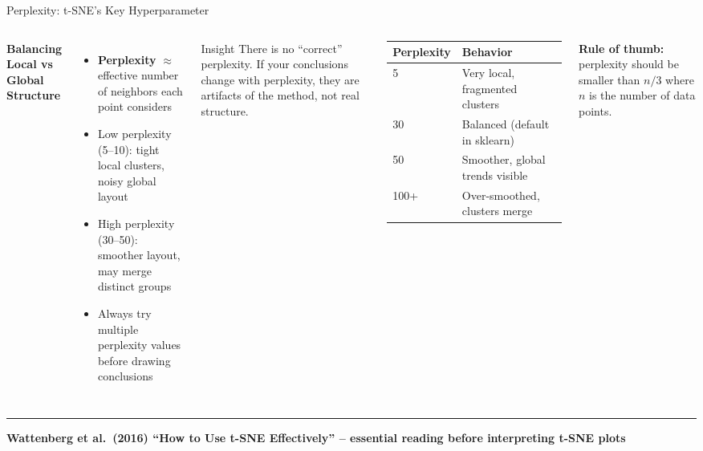 \documentclass[8pt,aspectratio=169]{beamer}
\newcommand{\bottomnote}[1]{%
\vfill
\vspace{-2mm}
\textcolor{mllavender2}{\rule{\textwidth}{0.4pt}}
\vspace{1mm}
\footnotesize
\textbf{#1}
}
\newenvironment{compactlist}{%
  \begin{itemize}%
    \setlength{\itemsep}{2pt}%
    \setlength{\parskip}{0pt}%
    \setlength{\parsep}{0pt}%
}{%
  \end{itemize}%
}
\newcommand{\highlight}[1]{\textcolor{mlorange}{\textbf{#1}}}
\begin{document}
\begin{frame}[t]{Perplexity: t-SNE's Key Hyperparameter}
\begin{columns}[T]
\small
\textbf{Balancing Local vs Global Structure}
\begin{compactlist}
\item \highlight{Perplexity} $\approx$ effective number of neighbors each point considers
\item Low perplexity (5--10): tight local clusters, noisy global layout
\item High perplexity (30--50): smoother layout, may merge distinct groups
\item Always try multiple perplexity values before drawing conclusions
\end{compactlist}

\begin{block}{Insight}
\scriptsize There is no ``correct'' perplexity. If your conclusions change with perplexity, they are artifacts of the method, not real structure.
\end{block}

\vspace{2mm}
\footnotesize
\begin{tabular}{@{}l p{3.0cm}@{}}
\toprule
\textbf{Perplexity} & \textbf{Behavior} \\
\midrule
\rowcolor{mllavender4}
5 & Very local, fragmented clusters \\
30 & Balanced (default in sklearn) \\
\rowcolor{mllavender4}
50 & Smoother, global trends visible \\
100+ & Over-smoothed, clusters merge \\
\bottomrule
\end{tabular}

\vspace{3mm}
\scriptsize \textbf{Rule of thumb:} perplexity should be smaller than $n/3$ where $n$ is the number of data points.
\end{columns}

\bottomnote{Wattenberg et al.\ (2016) ``How to Use t-SNE Effectively'' -- essential reading before interpreting t-SNE plots}
\end{frame}
\end{document}
